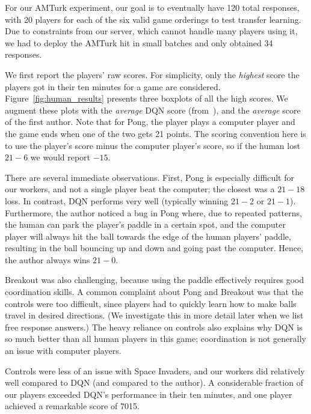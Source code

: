 \documentclass[letterpaper, 10 pt, conference]{ieeeconf}  %
\begin{document}
For our AMTurk experiment, our goal is to eventually have 120 total responses, with 20 players for
each of the six valid game orderings to test transfer learning. Due to constraints from our server,
which cannot handle many players using it, we had to deploy the AMTurk hit in small batches and only
obtained 34 responses.

We first report the players' raw scores. For simplicity, only the \emph{highest} score the players
got in their ten minutes for a game are considered. Figure~\ref{fig:human_results} presents three
boxplots of all the high scores. We augment these plots with the \emph{average} DQN score
(from~\cite{mnih-dqn-2015}), and the \emph{average} score of the first author. Note that for Pong,
the player plays a computer player and the game ends when one of the two gets 21 points. The scoring
convention here is to use the player's score minus the computer player's score, so if the human lost
$21-6$ we would report $-15$.

There are several immediate observations. First, Pong is especially difficult for our workers, and
not a single player beat the computer; the closest was a $21-18$ loss. In contrast, DQN performs
very well (typically winning $21-2$ or $21-1$). Furthermore, the author noticed a bug in Pong where,
due to repeated patterns, the human can park the player's paddle in a certain spot, and the computer
player will always hit the ball towards the edge of the human players' paddle, resulting in the ball
bouncing up and down and going past the computer. Hence, the author always wins $21-0$.

Breakout was also challenging, because using the paddle effectively requires good coordination
skills.  A common complaint about Pong and Breakout was that the controls were too difficult, since
players had to quickly learn how to make balls travel in desired directions. (We investigate this in
more detail later when we list free response answers.) The heavy reliance on controls also explains
why DQN is so much better than all human players in this game; coordination is not generally an
issue with computer players.

Controls were less of an issue with Space Invaders, and our workers did relatively well compared to
DQN (and compared to the author). A considerable fraction of our players exceeded DQN's performance
in their ten minutes, and one player achieved a remarkable score of 7015.
\end{document}
